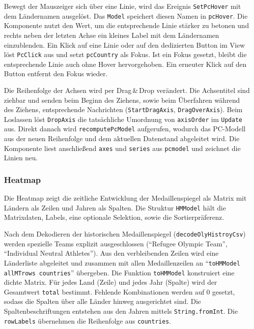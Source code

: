 Bewegt der Mauszeiger sich über eine Linie, wird das Ereignis \texttt{SetPcHover} mit dem Ländernamen ausgelöst. Das \texttt{Model} speichert diesen Namen in \texttt{pcHover}. Die Komponente nutzt den Wert, um die entsprechende Linie stärker zu betonen und rechts neben der letzten Achse ein kleines Label mit dem Ländernamen einzublenden. Ein Klick auf eine Linie oder auf den dedizierten Button im View löst \texttt{PcClick} aus und setzt \texttt{pcCountry} als Fokus. Ist ein Fokus gesetzt, bleibt die entsprechende Linie auch ohne Hover hervorgehoben. Ein erneuter Klick auf den Button entfernt den Fokus wieder.

Die Reihenfolge der Achsen wird per Drag\,\&\,Drop verändert. Die Achsentitel sind ziehbar und senden beim Beginn des Ziehens, sowie beim Überfahren während des Ziehens, entsprechende Nachrichten (\texttt{StartDragAxis}, \texttt{DragOverAxis}). Beim Loslassen löst \texttt{DropAxis} die tatsächliche Umordnung von \texttt{axisOrder} im \texttt{Update} aus. Direkt danach wird \texttt{recomputePcModel} aufgerufen, wodurch das PC-Modell aus der neuen Reihenfolge und dem aktuellen Datenstand abgeleitet wird. Die Komponente liest anschließend \texttt{axes} und \texttt{series} aus \texttt{pcmodel} und zeichnet die Linien neu.

\subsubsection{Heatmap}

Die Heatmap zeigt die zeitliche Entwicklung der Medaillenspiegel als Matrix mit Ländern als Zeilen und Jahren als Spalten. Die Struktur \texttt{HMModel} hält die Matrixdaten, Labels, eine optionale Selektion, sowie die Sortierpräferenz.

Nach dem Dekodieren der historischen Medaillenspiegel (\texttt{decodeOlyHistroyCsv}) werden spezielle Teams explizit ausgeschlossen (\enquote{Refugee Olympic Team}, \enquote{Individual Neutral Athletes}). Aus den verbleibenden Zeilen wird eine Länderliste abgeleitet und zusammen mit allen Medaillenzeilen an \enquote{\texttt{toHMModel allMTrows countries}} übergeben. Die Funktion \texttt{toHMModel} konstruiert eine dichte Matrix. Für jedes Land (Zeile) und jedes Jahr (Spalte) wird der Gesamtwert \texttt{total} bestimmt. Fehlende Kombinationen werden auf \(0\) gesetzt, sodass die Spalten über alle Länder hinweg ausgerichtet sind. Die Spaltenbeschriftungen entstehen aus den Jahren mittels \texttt{String.fromInt}. Die \texttt{rowLabels} übernehmen die Reihenfolge aus \texttt{countries}.

